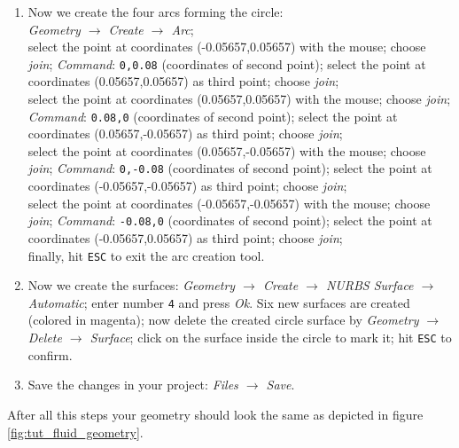 \begin{enumerate}
\item Now we create the four arcs forming the circle:\\ 
\emph{{Geometry} $\rightarrow$ Create $\rightarrow$ Arc};\\
select the point at coordinates (-0.05657,0.05657) with the mouse; choose \emph{join}; \emph{Command}: \texttt{0,0.08} (coordinates of second point); select the point at coordinates (0.05657,0.05657) as third point; choose \emph{join};\\
select the point at coordinates (0.05657,0.05657) with the mouse; choose \emph{join}; \emph{Command}: \texttt{0.08,0} (coordinates of second point); select the point at coordinates (0.05657,-0.05657) as third point; choose \emph{join};\\
select the point at coordinates (0.05657,-0.05657) with the mouse; choose \emph{join}; \emph{Command}: \texttt{0,-0.08} (coordinates of second point); select the point at coordinates (-0.05657,-0.05657) as third point; choose \emph{join};\\
select the point at coordinates (-0.05657,-0.05657) with the mouse; choose \emph{join}; \emph{Command}: \texttt{-0.08,0} (coordinates of second point); select the point at coordinates (-0.05657,0.05657) as third point; choose \emph{join};\\
finally, hit \texttt{ESC} to exit the arc creation tool.
\item Now we create the surfaces: \emph{{Geometry} $\rightarrow$ Create $\rightarrow$ NURBS Surface $\rightarrow$ Automatic}; enter number \texttt{4} and press \emph{Ok}. Six new surfaces are created (colored in magenta); now delete the created circle surface by \emph{{Geometry} $\rightarrow$ Delete $\rightarrow$ Surface}; click on the surface inside the circle to mark it; hit \texttt{ESC} to confirm.
\item Save the changes in your project: \emph{Files $\rightarrow$ Save}.
\end{enumerate}
After all this steps your geometry should look the same as depicted in figure \ref{fig:tut_fluid_geometry}.
